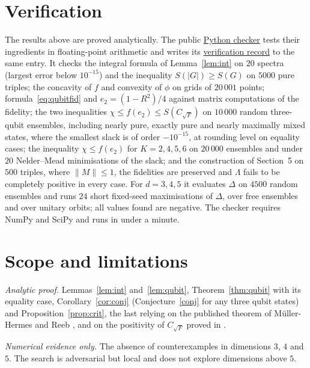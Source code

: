 \documentclass[11pt,a4paper]{article}
\theoremstyle{definition}
\theoremstyle{plain}
\newcommand{\norm}[1]{\lVert#1\rVert}
\newcommand{\CF}{C_{\sqrt F}}
\begin{document}
\section{Verification}\label{sec:verification}
The results above are proved analytically. The public
\href{https://github.com/jpbruneton/open_quantum_problems/blob/main/research/entries/fidelity-matrix-holevo-bound/checks/check_fidelity_holevo.py}{Python checker}
tests their ingredients in floating-point arithmetic and writes its
\href{https://github.com/jpbruneton/open_quantum_problems/blob/main/research/entries/fidelity-matrix-holevo-bound/data/verification.json}{verification record}
to the same entry. It checks the integral formula of Lemma~\ref{lem:int} on
$20$ spectra (largest error below $10^{-15}$) and the inequality
$S(|G|)\ge S(G)$ on $5000$ pure triples; the concavity of $f$ and convexity of
$\phi$ on grids of $20\,001$ points; formula~\eqref{eq:qubitfid} and
$e_2=(1-R^2)/4$ against matrix computations of the fidelity; the two
inequalities $\chi\le f(e_2)\le S(\CF)$ on $10\,000$ random three-qubit
ensembles, including nearly pure, exactly pure and nearly maximally mixed
states, where the smallest slack is of order $-10^{-15}$, at rounding level on
equality cases; the inequality $\chi\le f(e_2)$ for $K=2,4,5,6$ on $20\,000$
ensembles and under $20$ Nelder--Mead minimisations of the slack; and the
construction of Section~5 on $500$ triples, where $\norm M\le1$, the fidelities
are preserved and $\Lambda$ fails to be completely positive in every case. For
$d=3,4,5$ it evaluates $\Delta$ on $4500$ random ensembles and runs $24$ short
fixed-seed maximisations of $\Delta$, over free ensembles and over unitary
orbits; all values found are negative. The checker requires NumPy and SciPy
and runs in under a minute.

\section{Scope and limitations}\label{sec:scope}
\emph{Analytic proof.} Lemmas~\ref{lem:int} and~\ref{lem:qubit},
Theorem~\ref{thm:qubit} with its equality case, Corollary~\ref{cor:conj}
(Conjecture~\ref{conj} for any three qubit states) and
Proposition~\ref{prop:crit}, the last relying on the published theorem of
M\"uller-Hermes and Reeb \cite{MHR2017}, and on the positivity of $\CF$ proved
in \cite{FdMRZ2012}.

\emph{Numerical evidence only.} The absence of counterexamples in dimensions
$3$, $4$ and $5$. The search is adversarial but local and does not explore
dimensions above $5$.
\end{document}
